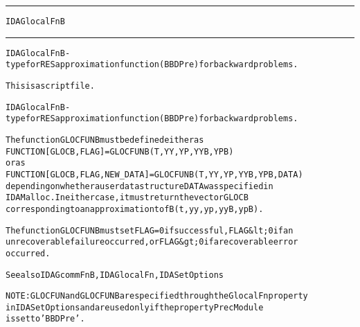 \begin{samepage}
\hrule
\begin{center}
{\large \verb!IDAGlocalFnB!}
\label{p:IDAGlocalFnB}
\end{center}
\hrule\vspace{0.1in}



\begin{alltt}
IDAGlocalFnB - type for RES approximation function (BBDPre) for backward problems.
\end{alltt}

\end{samepage}



\begin{samepage}


\begin{alltt}
This is a script file. 
\end{alltt}

\end{samepage}



\begin{alltt}
IDAGlocalFnB - type for RES approximation function (BBDPre) for backward problems.

   The function GLOCFUNB must be defined either as
        FUNCTION [GLOCB, FLAG] = GLOCFUNB(T,YY,YP,YYB,YPB)
   or as
        FUNCTION [GLOCB, FLAG, NEW_DATA] = GLOCFUNB(T,YY,YP,YYB,YPB,DATA)
   depending on whether a user data structure DATA was specified in
   IDAMalloc. In either case, it must return the vector GLOCB
   corresponding to an approximation to fB(t,yy,yp,yyB,ypB).

   The function GLOCFUNB must set FLAG=0 if successful, FLAG&lt;0 if an
   unrecoverable failure occurred, or FLAG&gt;0 if a recoverable error
   occurred.

   See also IDAGcommFnB, IDAGlocalFn, IDASetOptions

   NOTE: GLOCFUN and GLOCFUNB are specified through the GlocalFn property
   in IDASetOptions and are used only if the property PrecModule
   is set to 'BBDPre'.
\end{alltt}






\vspace{0.1in}
